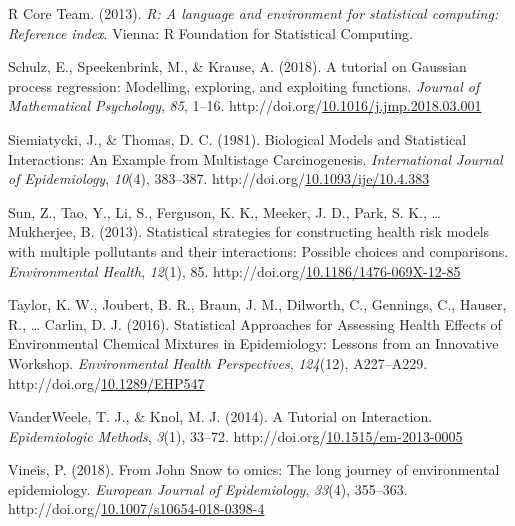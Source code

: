 \documentclass[12pt, twoside]{amherstthesis}
\newenvironment{CSLReferences}[2]%
  {}%
  {\par}
\begin{document}
\begin{CSLReferences}{1}{0}
\leavevmode{}%
R Core Team. (2013). \emph{R: A language and environment for statistical computing: Reference index}. Vienna: R Foundation for Statistical Computing.

\leavevmode{}%
Schulz, E., Speekenbrink, M., \& Krause, A. (2018). A tutorial on {Gaussian} process regression: {Modelling}, exploring, and exploiting functions. \emph{Journal of Mathematical Psychology}, \emph{85}, 1--16. http://doi.org/\href{https://doi.org/10.1016/j.jmp.2018.03.001}{10.1016/j.jmp.2018.03.001}

\leavevmode{}%
Siemiatycki, J., \& Thomas, D. C. (1981). Biological {Models} and {Statistical} {Interactions}: An {Example} from {Multistage} {Carcinogenesis}. \emph{International Journal of Epidemiology}, \emph{10}(4), 383--387. http://doi.org/\href{https://doi.org/10.1093/ije/10.4.383}{10.1093/ije/10.4.383}

\leavevmode{}%
Sun, Z., Tao, Y., Li, S., Ferguson, K. K., Meeker, J. D., Park, S. K., \ldots{} Mukherjee, B. (2013). Statistical strategies for constructing health risk models with multiple pollutants and their interactions: Possible choices and comparisons. \emph{Environmental Health}, \emph{12}(1), 85. http://doi.org/\href{https://doi.org/10.1186/1476-069X-12-85}{10.1186/1476-069X-12-85}

\leavevmode{}%
Taylor, K. W., Joubert, B. R., Braun, J. M., Dilworth, C., Gennings, C., Hauser, R., \ldots{} Carlin, D. J. (2016). Statistical {Approaches} for {Assessing} {Health} {Effects} of {Environmental} {Chemical} {Mixtures} in {Epidemiology}: {Lessons} from an {Innovative} {Workshop}. \emph{Environmental Health Perspectives}, \emph{124}(12), A227--A229. http://doi.org/\href{https://doi.org/10.1289/EHP547}{10.1289/EHP547}

\leavevmode{}%
VanderWeele, T. J., \& Knol, M. J. (2014). A {Tutorial} on {Interaction}. \emph{Epidemiologic Methods}, \emph{3}(1), 33--72. http://doi.org/\href{https://doi.org/10.1515/em-2013-0005}{10.1515/em-2013-0005}

\leavevmode{}%
Vineis, P. (2018). From {John} {Snow} to omics: The long journey of environmental epidemiology. \emph{European Journal of Epidemiology}, \emph{33}(4), 355--363. http://doi.org/\href{https://doi.org/10.1007/s10654-018-0398-4}{10.1007/s10654-018-0398-4}


\end{CSLReferences}
\end{document}
